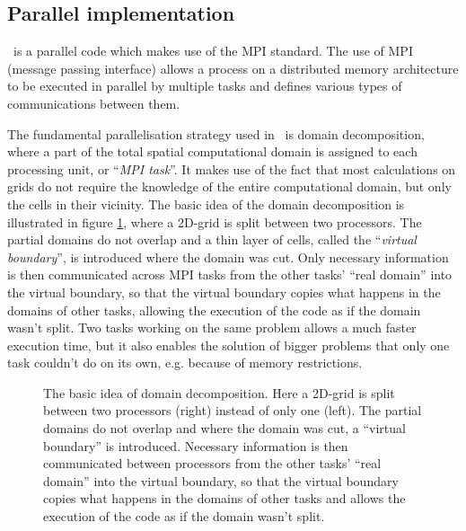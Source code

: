 \subsection{Parallel implementation}\label{chap:parallel}




\ramses\ is a parallel code which makes use of the MPI standard.
The use of MPI (message passing interface) allows a process on a distributed memory architecture to be executed in parallel by multiple tasks and defines various types of communications between them.

The fundamental parallelisation strategy used in \ramses\ is domain decomposition,
where a part of the total spatial computational domain is assigned to each processing unit, or ``\emph{MPI task}''.
It makes use of the fact that most calculations on grids do not require the knowledge of the entire computational domain, but only the cells in their vicinity.
The basic idea of the domain decomposition is illustrated in figure \ref{fig:parallel}, where a 2D-grid is split between two processors. 
The partial domains do not overlap and a thin layer of cells, called the ``\emph{virtual boundary}'', is introduced where the domain was cut. 
Only necessary information is then communicated across MPI tasks from the other tasks' ``real domain'' into the virtual boundary, so that the virtual boundary copies what happens in the domains of other tasks, allowing the execution of the code as if the domain wasn't split.
Two tasks working on the same problem allows a much faster execution time, but it also enables the solution of bigger problems that only one task couldn't do on its own, e.g. because of memory restrictions.

\begin{figure}[htbp]
	\centering
	\caption{
		The basic idea of domain decomposition. Here a 2D-grid is split between two processors (right) instead of only one (left). 
		The partial domains do not overlap and where the domain was cut, a  ``virtual boundary'' is introduced. 
		Necessary information is then communicated between processors from the other tasks' ``real domain'' into the virtual boundary, so that the virtual boundary copies what happens in the domains of other tasks and allows the execution of the code as if the domain wasn't split.
	}
	\label{fig:parallel}
\end{figure}




